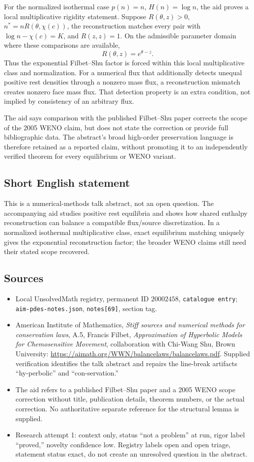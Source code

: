 \documentclass[11pt]{article}
\begin{document}
For the normalized isothermal case $p(n)=n$, $H(n)=\log n$, the aid proves a local multiplicative rigidity statement. Suppose $R(\theta,z)>0$, $n^*=nR(\theta,\chi(c))$, the reconstruction matches every pair with $\log n-\chi(c)=K$, and $R(z,z)=1$. On the admissible parameter domain where these comparisons are available,
\[
R(\theta,z)=e^{\theta-z}.
\]
Thus the exponential Filbet--Shu factor is forced within this local multiplicative class and normalization. For a numerical flux that additionally detects unequal positive rest densities through a nonzero mass flux, a reconstruction mismatch creates nonzero face mass flux. That detection property is an extra condition, not implied by consistency of an arbitrary flux.

The aid says comparison with the published Filbet--Shu paper corrects the scope of the 2005 WENO claim, but does not state the correction or provide full bibliographic data. The abstract's broad high-order preservation language is therefore retained as a reported claim, without promoting it to an independently verified theorem for every equilibrium or WENO variant.
\subsection{Short English statement}
This is a numerical-methods talk abstract, not an open question. The accompanying aid studies positive rest equilibria and shows how shared enthalpy reconstruction can balance a compatible flux/source discretization. In a normalized isothermal multiplicative class, exact equilibrium matching uniquely gives the exponential reconstruction factor; the broader WENO claims still need their stated scope recovered.
\subsection{Sources}
\begin{itemize}
\item Local UnsolvedMath registry, permanent ID $20002458$, \texttt{catalogue entry}; \texttt{aim-pdes-notes.json}, \texttt{notes[69]}, section tag.
\item American Institute of Mathematics, \emph{Stiff sources and numerical methods for conservation laws}, A.5, Francis Filbet, \emph{Approximation of Hyperbolic Models for Chemosensitive Movement}, collaboration with Chi-Wang Shu, Brown University: \url{https://aimath.org/WWN/balancelaws/balancelaws.pdf}. Supplied verification identifies the talk abstract and repairs the line-break artifacts ``hy-perbolic'' and ``con-servation.''
\item The aid refers to a published Filbet--Shu paper and a 2005 WENO scope correction without title, publication details, theorem numbers, or the actual correction. No authoritative separate reference for the structural lemma is supplied.
\item Research attempt 1: context only, status ``not a problem'' at run, rigor label ``proved,'' novelty confidence low. Registry labels open and open triage, statement status exact, do not create an unresolved question in the abstract.
\end{itemize}
\end{document}
